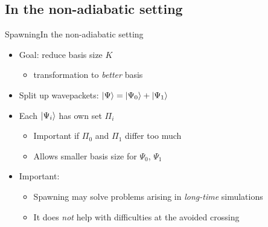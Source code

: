 \documentclass{beamer}
\begin{document}
\subsection{In the non-adiabatic setting}


\begin{frame}{Spawning}{In the non-adiabatic setting}
  \begin{itemize}
    \item Goal: reduce basis size $K$
    \begin{itemize}
      \item transformation to \emph{better} basis
    \end{itemize}
    \item Split up wavepackets: $\Ket{\Psi} = \Ket{\Psi_0} + \Ket{\Psi_1}$
    \item Each $\Ket{\Psi_i}$ has own set $\Pi_i$
    \begin{itemize}
      \item Important if $\Pi_0$ and $\Pi_1$ differ too much
      \item Allows smaller basis size for $\Psi_0$, $\Psi_1$
    \end{itemize}
    \item Important:
    \begin{itemize}
      \item Spawning may solve problems arising in \emph{long-time} simulations
      \item It does \emph{not} help with difficulties at the avoided crossing
    \end{itemize}
  \end{itemize}
\end{frame}
\end{document}
